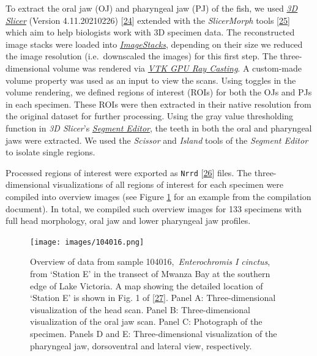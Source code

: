 To extract the oral jaw (OJ) and pharyngeal jaw (PJ) of the fish, we used \href{https://www.slicer.org}{\emph{3D Slicer}} (Version 4.11.20210226) {[}\protect\hyperlink{ref-OsCpHsJH}{24}{]} extended with the \emph{SlicerMorph} tools {[}\protect\hyperlink{ref-MwdN6kPV}{25}{]} which aim to help biologists work with 3D specimen data.
The reconstructed image stacks were loaded into \href{https://www.slicer.org/wiki/Documentation/Labs/ImageStacks}{\emph{ImageStacks}}, depending on their size we reduced the image resolution (i.e.~downscaled the images) for this first step.
The three-dimensional volume was rendered via \href{https://slicer.readthedocs.io/en/latest/user_guide/modules/volumerendering.html}{\emph{VTK GPU Ray Casting}}.
A custom-made volume property was used as an input to view the scans.
Using toggles in the volume rendering, we defined regions of interest (ROIs) for both the OJs and PJs in each specimen.
These ROIs were then extracted in their native resolution from the original dataset for further processing.
Using the gray value thresholding function in \emph{3D Slicer}'s \href{https://slicer.readthedocs.io/en/latest/user_guide/modules/segmenteditor.html}{\emph{Segment Editor}}, the teeth in both the oral and pharyngeal jaws were extracted.
We used the \emph{Scissor} and \emph{Island} tools of the \emph{Segment Editor} to isolate single regions.

Processed regions of interest were exported as \texttt{Nrrd} {[}\protect\hyperlink{ref-rn6XbmFW}{26}{]} files.
The three-dimensional visualizations of all regions of interest for each specimen were compiled into overview images (see Figure \ref{fig:104016} for an example from the compilation document).
In total, we compiled such overview images for 133 specimens with full head morphology, oral jaw and lower pharyngeal jaw profiles.

\begin{figure}
\hypertarget{fig:104016}{%
\centering
\texttt{[image: images/104016.png]}
\caption{Overview of data from sample 104016,~\emph{Enterochromis I cinctus}, from `Station E' in the transect of Mwanza Bay at the southern edge of Lake Victoria.
A map showing the detailed location of `Station E' is shown in Fig. 1 of {[}\protect\hyperlink{ref-JtHcU2O2}{27}{]}.
Panel A: Three-dimensional visualization of the head scan.
Panel B: Three-dimensional visualization of the oral jaw scan.
Panel C: Photograph of the specimen.
Panels D and E: Three-dimensional visualization of the pharyngeal jaw, dorsoventral and lateral view, respectively.}\label{fig:104016}
}
\end{figure}

